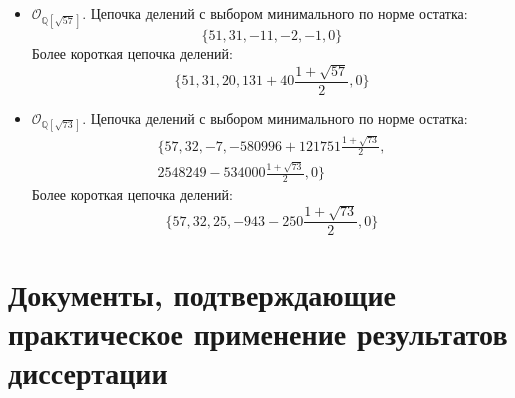 \documentclass[_00_dissertation.tex]{subfiles}
\begin{document}
\begin{itemize}
    \item $\mathcal{O}_{\mathbb{Q}[\sqrt{57}]}$.
    Цепочка делений с выбором минимального по норме остатка:
    \begin{equation*}
        \{51, 31, -11, -2, -1, 0\}
    \end{equation*}
    Более короткая цепочка делений:
    \begin{equation*}
        \{51, 31, 20, 131+40\frac{1+\sqrt{57}}{2}, 0\}
    \end{equation*}

    \item $\mathcal{O}_{\mathbb{Q}[\sqrt{73}]}$.
    Цепочка делений с выбором минимального по норме остатка:
    \begin{multline*}
        \{57, 32, -7, -580996+121751\frac{1+\sqrt{73}}{2},\\
        2548249-534000\frac{1+\sqrt{73}}{2}, 0\}
    \end{multline*}
    Более короткая цепочка делений:
    \begin{equation*}
        \{57, 32, 25, -943-250\frac{1+\sqrt{73}}{2}, 0\}
    \end{equation*}
\end{itemize}

\section*{Документы, подтверждающие практическое применение результатов диссертации}\label{section:Appendix_counterexample}

\onlyinsubfile{
    
}
\end{document}
